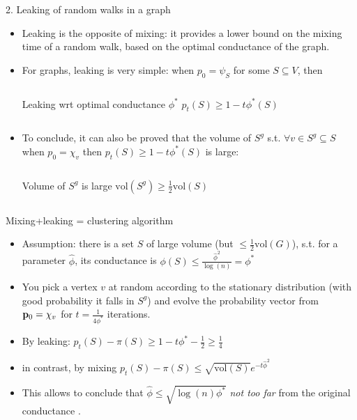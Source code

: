 \documentclass[../main.tex]{subfiles}
\begin{document}
    \begin{frame}{2. Leaking of random walks in a graph}
        \begin{itemize}
            \item Leaking is the opposite of mixing: it provides a lower bound on the mixing time of a random walk, based on the optimal conductance of the graph.
            \item For graphs, leaking is very simple: when $p_0= \psi_S$ for some $S\subseteq V$, then
                \begin{columns}
                    \begin{block}{Leaking wrt optimal conductance $\phi^*$}
                        $p_t(S) \geq 1 - t\phi^*(S)$
                    \end{block}
                \end{columns}
            \item To conclude, it can also be proved that the volume of $S^g$ s.t. $\forall v\in S^g\subseteq S$ when $p_0 = \chi_v$ then $p_t(S)\geq 1-t\phi^*(S)$ is large:
                \begin{columns}
                    \begin{block}{Volume of $S^g$ is large}
                        $\text{vol}(S^g) \geq \frac{1}{2}\text{vol}(S)$
                    \end{block}
                \end{columns}
        \end{itemize}
    \end{frame}
    
    \begin{frame}{Mixing+leaking = clustering algorithm}
        \begin{itemize}
            \item Assumption: there is a set $S$ of large volume (but $\leq \frac{1}{2}\text{vol}(G)$), s.t. for a parameter $\hat{\phi}$, its conductance is $\phi(S) \leq \frac{\hat{\phi}^2}{\log(n)} = \phi^*$
            \item You pick a vertex $v$ at random according to the stationary distribution (with good probability it falls in $S^g$) and evolve the probability vector from $\bold{p}_0 = \chi_v$ for $t=\frac{1}{4\phi^*}$ iterations.
            \item By leaking: $p_t(S) - \pi(S) \geq 1 - t\phi^* - \frac{1}{2} \geq \frac{1}{4}$
            \item in contrast, by mixing $p_t(S) - \pi(S) \leq \sqrt{\text{vol}(S)}e^{-t\hat{\phi}^2}$
            \item This allows to conclude that $\hat{\phi} \leq \sqrt{\log(n) \phi^*}$ \textit{not too far} from the original conductance \cite{SpielmanClustering}.
        \end{itemize}
    \end{frame}
    
\end{document}
